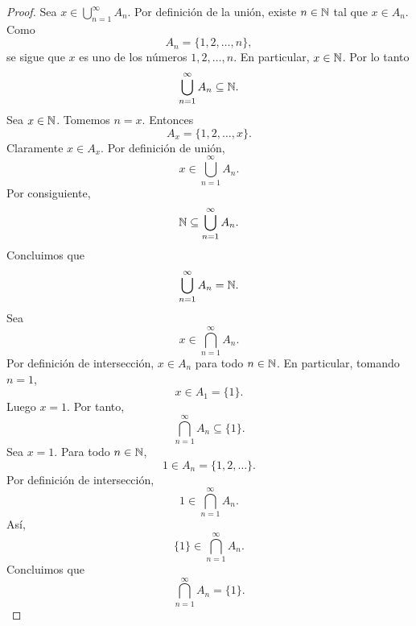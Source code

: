 \documentclass[12pt,a4paper]{article}
\begin{document}
    \begin{proof}
        Sea $x\in\bigcup_{n=1}^{\infty}A_{n}$. Por definición de la unión, existe $n\in\mathbb{N}$ tal que $x\in A_{n}$.
        Como
        \begin{equation*}
            A_{n}=\{1,2,\dots,n\},
        \end{equation*}
        se sigue que $x$ es uno de los números $1,2,\dots,n$. En particular, $x\in\mathbb{N}$. Por lo tanto
        \begin{equation*}
            \bigcup_{n=1}^{\infty}A_{n}\subseteq\mathbb{N}.
        \end{equation*}
        Sea $x\in\mathbb{N}$. Tomemos $n=x$. Entonces
        \begin{equation*}
            A_{x}=\{1,2,\dots,x\}.
        \end{equation*}
        Claramente $x\in A_{x}$. Por definición de unión,
        \begin{equation*}
            x\in\bigcup_{n=1}^{\infty}A_{n}.
        \end{equation*}
        Por consiguiente,
        \begin{equation*}
            \mathbb{N}\subseteq\bigcup_{n=1}^{\infty}A_{n}.
        \end{equation*}
        Concluimos que
        \begin{equation*}
            \bigcup_{n=1}^{\infty}A_{n}=\mathbb{N}.
        \end{equation*}
        Sea
        \begin{equation*}
            x\in\bigcap_{n=1}^{\infty}A_{n}.
        \end{equation*}
        Por definición de intersección, $x\in A_{n}$ para todo $n\in\mathbb{N}$. En particular, tomando $n=1$,
        \begin{equation*}
            x\in A_{1}=\{1\}.
        \end{equation*}
        Luego $x=1$. Por tanto,
        \begin{equation*}
            \bigcap_{n=1}^{\infty}A_{n}\subseteq\{1\}.
        \end{equation*}
        Sea $x=1$. Para todo $n\in\mathbb{N}$,
        \begin{equation*}
            1\in A_{n}=\{1,2,\dots\}.
        \end{equation*}
        Por definición de intersección,
        \begin{equation*}
            1\in\bigcap_{n=1}^{\infty}A_{n}.
        \end{equation*}
        Así,
        \begin{equation*}
            \{1\}\in\bigcap_{n=1}^{\infty}A_{n}.
        \end{equation*}
        Concluimos que
        \begin{equation*}
            \bigcap_{n=1}^{\infty}A_{n}=\{1\}.
        \end{equation*}
    \end{proof}
\end{document}
